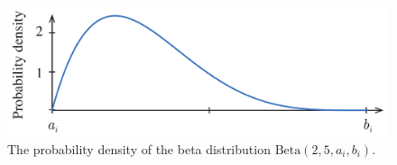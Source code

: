 \begin{figure}[t]
  \centering
  \includegraphics[width=1.0\columnwidth]{include/assets/figures/beta.pdf}
  \caption{The probability density of the beta distribution $\text{Beta}(2, 5, a_i, b_i)$.}
\end{figure}
